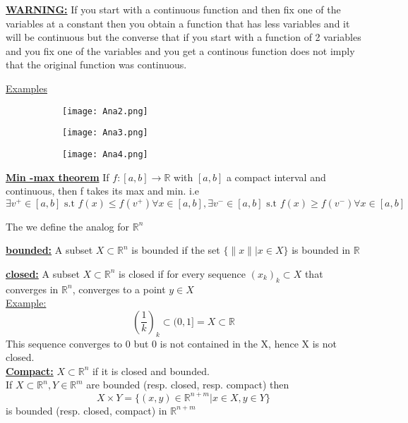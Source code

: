 \documentclass[8pt]{extreport}
\newcommand{\R}{\mathbb{R}}
\begin{document}
\underline{\textbf{WARNING:}} If you start with a continuous function and then fix one of the variables at a constant then you obtain a function that has less variables and it will be continuous but the converse that if you start with a function of 2 variables and you fix one of the variables and you get a continous function does not imply that the original function was continuous.

\underline{Examples}
\begin{figure}[H]
\centering
\begin{subfigure}[b]{0.4\linewidth}
\texttt{[image: Ana2.png]}
\end{subfigure}
\begin{subfigure}[b]{0.7\linewidth}
\texttt{[image: Ana3.png]}
\end{subfigure}
\begin{subfigure}[b]{0.7\linewidth}
\texttt{[image: Ana4.png]}
\end{subfigure}
\end{figure}

\underline{\textbf{Min -max theorem}} If $f:[a,b] \to \R$ with $[a,b]$ a compact interval and continuous, then f takes its max and min. i.e 
$$ \exists v^{+} \in [a,b] \text{ s.t } f(x) \leq f(v^{+}) \forall x \in [a,b], \exists v^- \in [a,b] \text{ s.t } f(x) \geq f(v^-) \forall x \in [a,b]$$

The we define the analog for $\R^n$

\underline{\textbf{bounded:}} A  subset $X \subset \R^n$ is bounded if the set $\{\|x\| |x \in X\}$ is bounded in $\R$

\underline{\textbf{closed:}} A subset $X \subset \R^n$ is closed if for every sequence $(x_k)_k \subset X$ that converges in $\R^n$, converges to a point $y \in X$\\
\underline{Example:}\\
$$(\frac{1}{k})_k \subset (0,1] = X \subset \R$$
This sequence converges to 0 but 0 is not contained in the X, hence X is not closed.\\

\underline{\textbf{Compact:}} $X \subset \R^n$ if it is closed and bounded.\\

If $X \subset \R^n, Y \in \R^m$ are bounded (resp. closed, resp. compact) then 
$$ X \times Y = \{(x,y) \in \R^{n+m} | x \in X, y \in Y \}$$
is bounded (resp. closed, compact) in $\R^{n+m}$\\
\end{document}
